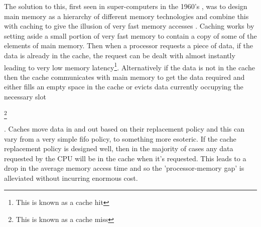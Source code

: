 The solution to this, first seen in super-computers in the 1960's \cite{pattersonComputerOrganizationDesign2018}, was to design main memory as a hierarchy of different memory technologies \cite{wilkesSlaveMemoriesDynamic1965} and combine this with caching to give the illusion of very fast memory accesses \cite{smithCacheMemories1982}. Caching works by setting aside a small portion of very fast memory to contain a copy of some of the elements of main memory. Then when a processor requests a piece of data, if the data is already in the cache, the request can be dealt with almost instantly leading to very low memory latency\footnote{This is known as a cache hit}. Alternatively if the data is not in the cache then the cache communicates with main memory to get the data required and either fills an empty space in the cache or evicts data currently occupying the necessary slot \begin{NoHyper}\footnote{This is known as a cache miss}\end{NoHyper}. Caches move data in and out based on their replacement policy and this can vary from a very simple \gls{fifo} policy, to something more esoteric\cite{al-zoubiPerformanceEvaluationCache2004}. If the cache replacement policy is designed well,  then in the majority of cases any data requested by the CPU will be in the cache when it's requested. This leads to a drop in the average memory access time and so the 'processor-memory gap' is alleviated without incurring enormous cost.


